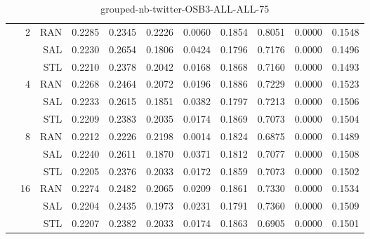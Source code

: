 \begin{center}
\begin{table}[htbp]
\begin{center}
\begin{tabular}{ | r | r | r | r | r | r | r | r | r | r | r |}
 & \multirow{3}{*}{2} & RAN & 0.2285 & 0.2345 & 0.2226 & 0.0060 & 0.1854 & 0.8051 & 0.0000 & 0.1548\\ \cline{3-11}
 &   & SAL & 0.2230 & 0.2654 & 0.1806 & 0.0424 & 0.1796 & 0.7176 & 0.0000 & 0.1496\\ \cline{3-11}
 &   & STL & 0.2210 & 0.2378 & 0.2042 & 0.0168 & 0.1868 & 0.7160 & 0.0000 & 0.1493\\ \cline{2-11}
 & \multirow{3}{*}{4} & RAN & 0.2268 & 0.2464 & 0.2072 & 0.0196 & 0.1886 & 0.7229 & 0.0000 & 0.1523\\ \cline{3-11}
 &   & SAL & 0.2233 & 0.2615 & 0.1851 & 0.0382 & 0.1797 & 0.7213 & 0.0000 & 0.1506\\ \cline{3-11}
 &   & STL & 0.2209 & 0.2383 & 0.2035 & 0.0174 & 0.1869 & 0.7073 & 0.0000 & 0.1504\\ \cline{2-11}
 & \multirow{3}{*}{8} & RAN & 0.2212 & 0.2226 & 0.2198 & 0.0014 & 0.1824 & 0.6875 & 0.0000 & 0.1489\\ \cline{3-11}
 &   & SAL & 0.2240 & 0.2611 & 0.1870 & 0.0371 & 0.1812 & 0.7077 & 0.0000 & 0.1508\\ \cline{3-11}
 &   & STL & 0.2205 & 0.2376 & 0.2033 & 0.0172 & 0.1859 & 0.7073 & 0.0000 & 0.1502\\ \cline{2-11}
 & \multirow{3}{*}{16} & RAN & 0.2274 & 0.2482 & 0.2065 & 0.0209 & 0.1861 & 0.7330 & 0.0000 & 0.1534\\ \cline{3-11}
 &   & SAL & 0.2204 & 0.2435 & 0.1973 & 0.0231 & 0.1791 & 0.7360 & 0.0000 & 0.1509\\ \cline{3-11}
 &   & STL & 0.2207 & 0.2382 & 0.2033 & 0.0174 & 0.1863 & 0.6905 & 0.0000 & 0.1501\\ \cline{2-11}
\hline
\end{tabular}
\caption{grouped-nb-twitter-OSB3-ALL-ALL-75}
\end{center}
 \end{table}
\end{center}

